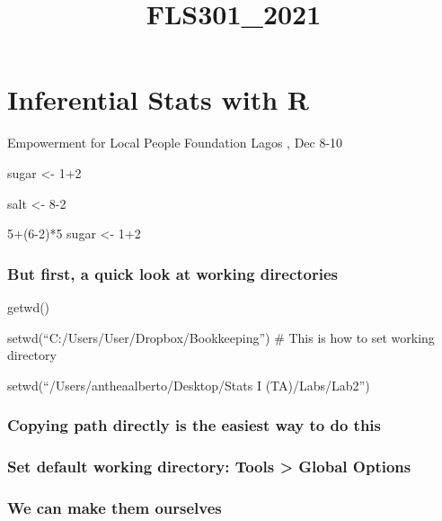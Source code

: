 \documentclass[
]{article}
\title{FLS301\_2021}
\author{}
\date{\vspace{-2.5em}}
\begin{document}
\maketitle

\hypertarget{inferential-stats-with-r}{%
\section{Inferential Stats with R}\label{inferential-stats-with-r}}

Empowerment for Local People Foundation Lagos , Dec 8-10

sugar \textless- 1+2

salt \textless- 8-2

5+(6-2)*5 sugar \textless- 1+2

\hypertarget{but-first-a-quick-look-at-working-directories}{%
\subsubsection{But first, a quick look at working
directories}\label{but-first-a-quick-look-at-working-directories}}

getwd()

setwd(``C:/Users/User/Dropbox/Bookkeeping'') \# This is how to set
working directory

setwd(``/Users/antheaalberto/Desktop/Stats I (TA)/Labs/Lab2'')

\hypertarget{copying-path-directly-is-the-easiest-way-to-do-this}{%
\subsubsection{Copying path directly is the easiest way to do
this}\label{copying-path-directly-is-the-easiest-way-to-do-this}}

\hypertarget{set-default-working-directory-tools-global-options}{%
\subsubsection{Set default working directory: Tools \textgreater{}
Global
Options}\label{set-default-working-directory-tools-global-options}}

\hypertarget{we-can-make-them-ourselves}{%
\subsubsection{We can make them
ourselves}\label{we-can-make-them-ourselves}}
\end{document}
